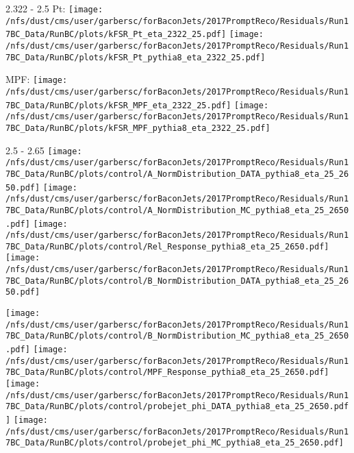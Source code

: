\documentclass[t,compress]{beamer}
\begin{document}
\begin{frame}{2.322 - 2.5}
	 Pt: \texttt{[image: /nfs/dust/cms/user/garbersc/forBaconJets/2017PromptReco/Residuals/Run17BC\_Data/RunBC/plots/kFSR\_Pt\_eta\_2322\_25.pdf]}
	\texttt{[image: /nfs/dust/cms/user/garbersc/forBaconJets/2017PromptReco/Residuals/Run17BC\_Data/RunBC/plots/kFSR\_Pt\_pythia8\_eta\_2322\_25.pdf]}
\newline

	 MPF: \texttt{[image: /nfs/dust/cms/user/garbersc/forBaconJets/2017PromptReco/Residuals/Run17BC\_Data/RunBC/plots/kFSR\_MPF\_eta\_2322\_25.pdf]}
	\texttt{[image: /nfs/dust/cms/user/garbersc/forBaconJets/2017PromptReco/Residuals/Run17BC\_Data/RunBC/plots/kFSR\_MPF\_pythia8\_eta\_2322\_25.pdf]}
\end{frame}

\begin{frame}{2.5 - 2.65}
	\texttt{[image: /nfs/dust/cms/user/garbersc/forBaconJets/2017PromptReco/Residuals/Run17BC\_Data/RunBC/plots/control/A\_NormDistribution\_DATA\_pythia8\_eta\_25\_2650.pdf]}
	\texttt{[image: /nfs/dust/cms/user/garbersc/forBaconJets/2017PromptReco/Residuals/Run17BC\_Data/RunBC/plots/control/A\_NormDistribution\_MC\_pythia8\_eta\_25\_2650.pdf]}
	\texttt{[image: /nfs/dust/cms/user/garbersc/forBaconJets/2017PromptReco/Residuals/Run17BC\_Data/RunBC/plots/control/Rel\_Response\_pythia8\_eta\_25\_2650.pdf]}
	\texttt{[image: /nfs/dust/cms/user/garbersc/forBaconJets/2017PromptReco/Residuals/Run17BC\_Data/RunBC/plots/control/B\_NormDistribution\_DATA\_pythia8\_eta\_25\_2650.pdf]}
\newline

	\texttt{[image: /nfs/dust/cms/user/garbersc/forBaconJets/2017PromptReco/Residuals/Run17BC\_Data/RunBC/plots/control/B\_NormDistribution\_MC\_pythia8\_eta\_25\_2650.pdf]}
	\texttt{[image: /nfs/dust/cms/user/garbersc/forBaconJets/2017PromptReco/Residuals/Run17BC\_Data/RunBC/plots/control/MPF\_Response\_pythia8\_eta\_25\_2650.pdf]}
	\texttt{[image: /nfs/dust/cms/user/garbersc/forBaconJets/2017PromptReco/Residuals/Run17BC\_Data/RunBC/plots/control/probejet\_phi\_DATA\_pythia8\_eta\_25\_2650.pdf]}
	\texttt{[image: /nfs/dust/cms/user/garbersc/forBaconJets/2017PromptReco/Residuals/Run17BC\_Data/RunBC/plots/control/probejet\_phi\_MC\_pythia8\_eta\_25\_2650.pdf]}
\end{frame}
\end{document}
